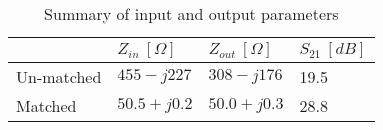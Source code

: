 \documentclass[report.tex]{subfiles}
\begin{document}
%

\begin{table}
    \centering
    \caption{Summary of input and output parameters}
    \begin{tabular}{l | l l l}
        & $Z_{in}~[\Omega]$ & $Z_{out}~[\Omega]$ & $S_{21}~[dB]$\\
        \hline
        Un-matched & $455-j227$  & $308-j176$  & 19.5 \\
        Matched    & $50.5+j0.2$ & $50.0+j0.3$ & 28.8 \\
    \end{tabular}
\end{table}

\clearpage
\end{document}
